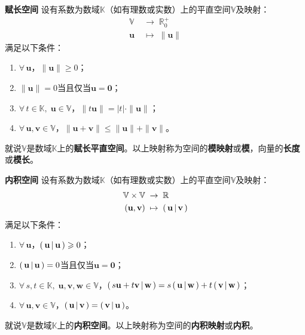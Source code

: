 \documentclass[12pt,UTF8]{ctexbook}
\begin{document}
\begin{appendix}
\begin{df}{\textbf{赋长空间}}
    设有系数为数域$\mathbb{K}$（如有理数或实数）上的平直空间$\mathbb{V}$及映射：
    \begin{align*}
        \mathbb{V} \;&\rightarrow \;\mathbb{R}_0^+ \\
        \mathbf{u} \;&\mapsto \;\| \mathbf{u} \|
    \end{align*}
    满足以下条件：
    \begin{enumerate}
        \item $\forall \, \mathbf{u}$，$\|\mathbf{u}\| \geqslant 0$；
        \item $\| \mathbf{u} \| = 0$当且仅当$\mathbf{u} = \mathbf{0}$；
        \item $\forall \, t \in \mathbb{K}, \; \mathbf{u}\in \mathbb{V}$，$\| t\mathbf{u}\| = |t|\cdot \|\mathbf{u}\|$；
        \item $\forall \, \mathbf{u}, \mathbf{v} \in \mathbb{V}$，$\|\mathbf{u} + \mathbf{v}\| \leqslant \|\mathbf{u}\| + \|\mathbf{v}\|$。
    \end{enumerate}
    就说$\mathbb{V}$是数域$\mathbb{K}$上的\textbf{赋长平直空间}。以上映射称为空间的\textbf{模映射}或\textbf{模}，向量的\textbf{长度}或\textbf{模长}。
\end{df}

\begin{df}{\textbf{内积空间}}
    设有系数为数域$\mathbb{K}$（如有理数或实数）上的平直空间$\mathbb{V}$及映射：
    \begin{align*}
        \mathbb{V}\times \mathbb{V} \;&\rightarrow \;\mathbb{R} \\
        (\mathbf{u}, \mathbf{v}) \;&\mapsto \; \displaystyle\left( \,\mathbf{u} \,\middle\vert \,\mathbf{v} \,\right)
    \end{align*}
    满足以下条件：
    \begin{enumerate}
        \item $\forall \, \mathbf{u}$，$\displaystyle\left( \,\mathbf{u} \,\middle\vert \,\mathbf{u} \,\right) \geqslant 0$；
        \item $\displaystyle\left( \,\mathbf{u} \,\middle\vert \,\mathbf{u} \,\right) = 0$当且仅当$\mathbf{u} = \mathbf{0}$；
        \item $\forall \, s, t \in \mathbb{K}, \; \mathbf{u}, \mathbf{v}, \mathbf{w}\in \mathbb{V}$，$\displaystyle\left( \,s\mathbf{u} + t\mathbf{v} \,\middle\vert \,\mathbf{w} \,\right) = s\displaystyle\left( \,\mathbf{u} \,\middle\vert \,\mathbf{w} \,\right) + t\displaystyle\left( \,\mathbf{v} \,\middle\vert \,\mathbf{w} \,\right)$；
        \item $\forall \, \mathbf{u}, \mathbf{v} \in \mathbb{V}$，$\displaystyle\left( \,\mathbf{u} \,\middle\vert \,\mathbf{v} \,\right) = \displaystyle\left( \,\mathbf{v} \,\middle\vert \,\mathbf{u} \,\right)$。
    \end{enumerate}
    就说$\mathbb{V}$是数域$\mathbb{K}$上的\textbf{内积空间}。以上映射称为空间的\textbf{内积映射}或\textbf{内积}。
\end{df}


\end{appendix}
\end{document}
